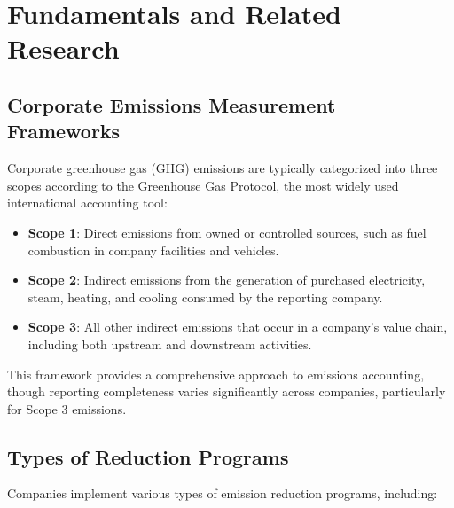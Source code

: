 \documentclass[11pt,a4paper]{article}
\begin{document}
\section{Fundamentals and Related Research}

\subsection{Corporate Emissions Measurement Frameworks}
Corporate greenhouse gas (GHG) emissions are typically categorized into three scopes according to the Greenhouse Gas Protocol, the most widely used international accounting tool:

\begin{itemize}
    \item \textbf{Scope 1}: Direct emissions from owned or controlled sources, such as fuel combustion in company facilities and vehicles.
    
    \item \textbf{Scope 2}: Indirect emissions from the generation of purchased electricity, steam, heating, and cooling consumed by the reporting company.
    
    \item \textbf{Scope 3}: All other indirect emissions that occur in a company's value chain, including both upstream and downstream activities.
\end{itemize}

This framework provides a comprehensive approach to emissions accounting, though reporting completeness varies significantly across companies, particularly for Scope 3 emissions.

\subsection{Types of Reduction Programs}
Companies implement various types of emission reduction programs, including:
\end{document}
